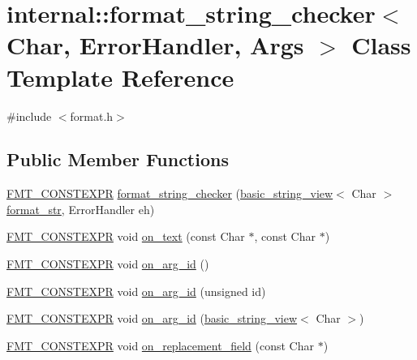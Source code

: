\hypertarget{classinternal_1_1format__string__checker}{}\section{internal\+:\+:format\+\_\+string\+\_\+checker$<$ Char, Error\+Handler, Args $>$ Class Template Reference}
\label{classinternal_1_1format__string__checker}


{\ttfamily \#include $<$format.\+h$>$}

\subsection*{Public Member Functions}
\begin{DoxyCompactItemize}
\item 
\hyperlink{core_8h_a69201cb276383873487bf68b4ef8b4cd}{F\+M\+T\+\_\+\+C\+O\+N\+S\+T\+E\+X\+PR} \hyperlink{classinternal_1_1format__string__checker_ace9b5d14d17800788cb39fcfe900712d}{format\+\_\+string\+\_\+checker} (\hyperlink{classbasic__string__view}{basic\+\_\+string\+\_\+view}$<$ Char $>$ \hyperlink{format_8h_aa2b402011ee0619f2158f13e0827e585}{format\+\_\+str}, Error\+Handler eh)
\item 
\hyperlink{core_8h_a69201cb276383873487bf68b4ef8b4cd}{F\+M\+T\+\_\+\+C\+O\+N\+S\+T\+E\+X\+PR} void \hyperlink{classinternal_1_1format__string__checker_a80292d0556871811a821bca796f770c3}{on\+\_\+text} (const Char $\ast$, const Char $\ast$)
\item 
\hyperlink{core_8h_a69201cb276383873487bf68b4ef8b4cd}{F\+M\+T\+\_\+\+C\+O\+N\+S\+T\+E\+X\+PR} void \hyperlink{classinternal_1_1format__string__checker_aa885efcd3d9786997df78121b82b85a2}{on\+\_\+arg\+\_\+id} ()
\item 
\hyperlink{core_8h_a69201cb276383873487bf68b4ef8b4cd}{F\+M\+T\+\_\+\+C\+O\+N\+S\+T\+E\+X\+PR} void \hyperlink{classinternal_1_1format__string__checker_ae316eacf72218eeaf2b15899d548a00b}{on\+\_\+arg\+\_\+id} (unsigned id)
\item 
\hyperlink{core_8h_a69201cb276383873487bf68b4ef8b4cd}{F\+M\+T\+\_\+\+C\+O\+N\+S\+T\+E\+X\+PR} void \hyperlink{classinternal_1_1format__string__checker_a32971d1bbff2686a400f2edba4473d8a}{on\+\_\+arg\+\_\+id} (\hyperlink{classbasic__string__view}{basic\+\_\+string\+\_\+view}$<$ Char $>$)
\item 
\hyperlink{core_8h_a69201cb276383873487bf68b4ef8b4cd}{F\+M\+T\+\_\+\+C\+O\+N\+S\+T\+E\+X\+PR} void \hyperlink{classinternal_1_1format__string__checker_a0d7bcf166939fea3198891cd0e574997}{on\+\_\+replacement\+\_\+field} (const Char $\ast$)

\end{DoxyCompactItemize}
